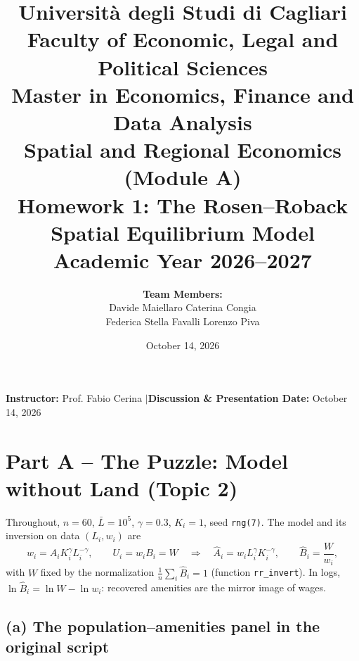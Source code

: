 \documentclass[11pt,a4paper]{article}
\title{\vspace{-1.5cm}
    \large\textbf{Università degli Studi di Cagliari}\\
    \normalsize Faculty of Economic, Legal and Political Sciences\\
    \normalsize Master in Economics, Finance and Data Analysis\\[1.5ex]
    \Large\textbf{Spatial and Regional Economics (Module A)}\\
    \large\textbf{Homework 1: The Rosen--Roback Spatial Equilibrium Model}\\
    \normalsize Academic Year 2026--2027
}
\author{
    \textbf{Team Members:}\\[0.5ex]
    Davide Maiellaro \quad Caterina Congia\\[0.5ex]
    Federica Stella Favalli \quad Lorenzo Piva
}
\date{October 14, 2026}
\begin{document}
\maketitle

\vspace{-0.5cm}
\begin{center}
    \small
    \textbf{Instructor:} Prof. Fabio Cerina \quad$\vert$\quad \textbf{Discussion \& Presentation Date:} October 14, 2026
\end{center}
\vspace{0.2cm}

\noindent{}

\vspace{0.5cm}

\section*{Part A -- The Puzzle: Model without Land (Topic 2)}

\noindent Throughout, $n = 60$, $\bar L = 10^5$, $\gamma = 0.3$, $K_i = 1$, seed \texttt{rng(7)}. The model and its inversion on data $(L_i, w_i)$ are
\begin{equation}
    w_i = A_i K_i^{\gamma} L_i^{-\gamma}, \qquad U_i = w_i B_i = W
    \quad\Longrightarrow\quad
    \hat A_i = w_i L_i^{\gamma} K_i^{-\gamma}, \qquad \hat B_i = \frac{W}{w_i},
    \label{eq:inversion}
\end{equation}
with $W$ fixed by the normalization $\frac{1}{n}\sum_i \hat B_i = 1$ (function \texttt{rr\_invert}). In logs, $\ln \hat B_i = \ln W - \ln w_i$: recovered amenities are the mirror image of wages.

\subsection*{(a) The population--amenities panel in the original script}
\end{document}
